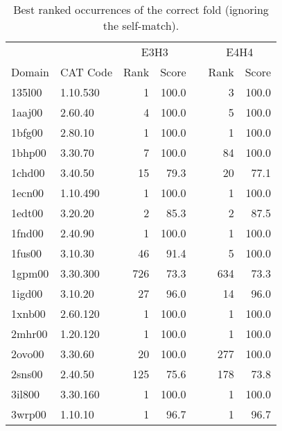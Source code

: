 \begin{table}
\begin{center}
\begin{tabular}{llrrlrr} \hline
        &               & \multicolumn{2}{c}{E3H3}&     &\multicolumn{2}{c}{E4H4} \\ \cline{3-4}\cline{6-7}
Domain  & CAT Code      & Rank  & Score         &       & Rank  & Score \\ \hline
135l00  & 1.10.530      & 1     & 100.0         &       & 3     & 100.0 \\
1aaj00  & 2.60.40       & 4     & 100.0         &       & 5     & 100.0 \\
1bfg00  & 2.80.10       & 1     & 100.0         &       & 1     & 100.0 \\
1bhp00  & 3.30.70       & 7     & 100.0         &       & 84    & 100.0 \\
1chd00  & 3.40.50       & 15    & 79.3          &       & 20    & 77.1  \\
1ecn00  & 1.10.490      & 1     & 100.0         &       & 1     & 100.0 \\
1edt00  & 3.20.20       & 2     & 85.3          &       & 2     & 87.5  \\
1fnd00  & 2.40.90       & 1     & 100.0         &       & 1     & 100.0 \\
1fus00  & 3.10.30       & 46    & 91.4          &       & 5     & 100.0 \\
1gpm00  & 3.30.300      & 726   & 73.3          &       & 634   & 73.3  \\
1igd00  & 3.10.20       & 27    & 96.0          &       & 14    & 96.0  \\
1xnb00  & 2.60.120      & 1     & 100.0         &       & 1     & 100.0 \\
2mhr00  & 1.20.120      & 1     & 100.0         &       & 1     & 100.0 \\
2ovo00  & 3.30.60       & 20    & 100.0         &       & 277   & 100.0 \\
2sns00  & 2.40.50       & 125   & 75.6          &       & 178   & 73.8  \\
3il800  & 3.30.160      & 1     & 100.0         &       & 1     & 100.0 \\
3wrp00  & 1.10.10       & 1     & 96.7          &       & 1     & 96.7  \\ \hline
\end{tabular}
\end{center}
\caption{\label{tab:best} Best ranked occurrences of the correct fold (ignoring the self-match).}
\end{table}
